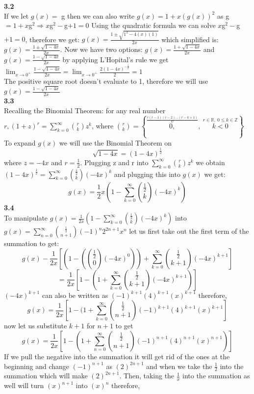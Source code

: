 \documentclass[10pt,a4paper]{report}
\begin{document}
	\newline
	\textbf{3.2}\\
	If we let $g(x) = $ g then we can also write $g(x) = 1 + x(g(x))^2$ as g$ = 1 + x$g$^2 \Rightarrow x$g$^2 - $g$ + 1 = 0$ Using the quadratic formula we can solve $x$g$^2 - $g$ + 1 = 0$, therefore we get: $g(x) = \frac{1\pm\sqrt{1^2 - 4(x)(1)}}{2x}$ which simplified is: $g(x) = \frac{1\pm\sqrt{1-4x}}{2x}$.  Now we have two options: $g(x) = \frac{1 + \sqrt{1-4x}}{2x}$ and $g(x) = \frac{1 - \sqrt{1-4x}}{2x}$ by applying L'Hopital's rule we get $\lim_{x\to0^+}\frac{1-\sqrt{1-4x}}{2x} = \lim_{x\to0^+}\frac{2(1-4x)^{-\frac{1}{2}}}{2} = 1$\\
	The positive square root doesn't evaluate to 1, therefore we will use $g(x) = \frac{1 - \sqrt{1-4x}}{2x}$\\
	\newline
	\textbf{3.3}\\
	Recalling the Binomial Theorem: for any real number $r,(1+z)^r = \sum_{k=0}^{\infty}\binom{r}{k}z^k$, where $\binom{r}{k} = \left \lbrace \overset{\frac{r(r-1)(r-2)...(r-k+1)}{k!}}{0,},\ \overset{r\in\mathbb{R},\ 0\leq k\in\mathbb{Z}}{k<0} \right \rbrace$\\
	To expand $g(x)$ we will use the Binomial Theorem on
	\[\sqrt{1-4x} = (1-4x)^{\frac{1}{2}}\] where $z = -4x$ and $r= \frac{1}{2}$.  Plugging z and r into $\sum_{k=0}^{\infty}\binom{r}{k}z^k$ we obtain $(1 - 4x)^{\frac{1}{2}} = \sum_{k=0}^{\infty}\binom{\frac{1}{2}}{k}(-4x)^k$ and plugging this into $g(x)$ we get:
	\[g(x) = \frac{1}{2}x(1 - \sum_{k=0}^{\infty}\binom{\frac{1}{2}}{k}(-4x)^k) \]
	\textbf{3.4}\\
	To manipulate $g(x) = \frac{1}{2x}(1-\sum_{k=0}^{\infty}\binom{\frac{1}{2}}{k}(-4x)^k)$ into $g(x) = \sum_{n=0}^{\infty}\binom{\frac{1}{2}}{n+1}(-1)^n2^{2n+1}x^n$ let us first take out the first term of the summation to get:
	\[g(x) - \frac{1}{2x}[(1-(\binom{\frac{1}{2}}{0}(-4x)^0))+\sum_{k=0}^{\infty}\binom{\frac{1}{2}}{k+1}(-4x)^{k+1}]\]
	\[= \frac{1}{2x}[1-(1 + \sum_{k=0}^{\infty}\binom{\frac{1}{2}}{k+1}(-4x)^{k+1})]\]
	$(-4x)^{k+1}$ can also be written as $(-1)^{k+1}(4)^{k+1}(x)^{k+1}$	therefore,
	\[g(x) = \frac{1}{2x}[1-(1+\sum_{k=0}^{\infty}\binom{\frac{1}{2}}{n+1}(-1)^{k+1}(4)^{k+1}(x)^{k+1}]\]
	now let us substitute $k+1$ for $n+1$ to get
	\[g(x) = \frac{1}{2x}[1 - (1+\sum_{n=0}^{\infty}\binom{\frac{1}{2}}{n+1}(-1)^{n+1}(4)^{n+1}(x)^{n+1})]\]
	If we pull the negative into the summation it will get rid of the ones at the beginning and change $(-1)^{n+1}$ as $(2)^{2n+1}$ and when we take the $\frac{1}{2}$ into the summation which will make $(2)^{2n+1}$.  Then, taking the $\frac{1}{x}$ into the summation as well will turn $(x)^{n+1}$ into $(x)^n$ therefore,
\end{document}
